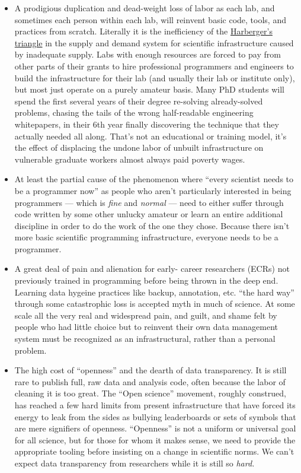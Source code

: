 \documentclass[10pt]{article}
\begin{document}
\begin{multicols}{2}
\begin{itemize}
\item
  A prodigious duplication and dead-weight loss of labor as each lab,
  and sometimes each person within each lab, will reinvent basic code,
  tools, and practices from scratch. Literally it is the inefficiency of
  the
  \href{https://en.wikipedia.org/wiki/Deadweight_loss\#Harberger's_triangle}{Harberger's
  triangle} in the supply and demand system for scientific
  infrastructure caused by inadequate supply. Labs with enough resources
  are forced to pay from other parts of their grants to hire
  professional programmers and engineers to build the infrastructure for
  their lab (and usually their lab or institute only), but most just
  operate on a purely amateur basis. Many PhD students will spend the
  first several years of their degree re-solving already-solved
  problems, chasing the tails of the wrong half-readable engineering
  whitepapers, in their 6th year finally discovering the technique that
  they actually needed all along. That's not an educational or training
  model, it's the effect of displacing the undone labor of unbuilt
  infrastructure on vulnerable graduate workers almost always paid
  poverty wages.
\item
  At least the partial cause of the phenomenon where ``every scientist
  needs to be a programmer now'' as people who aren't particularly
  interested in being programmers --- which is \emph{fine} and
  \emph{normal} --- need to either suffer through code written by some
  other unlucky amateur or learn an entire additional discipline in
  order to do the work of the one they chose. Because there isn't more
  basic scientific programming infrastructure, everyone needs to be a
  programmer.
\item
  A great deal of pain and alienation for early- career researchers
  (ECRs) not previously trained in programming before being thrown in
  the deep end. Learning data hygeine practices like backup, annotation,
  etc. ``the hard way'' through some catastrophic loss is accepted myth
  in much of science. At some scale all the very real and widespread
  pain, and guilt, and shame felt by people who had little choice but to
  reinvent their own data management system must be recognized as an
  infrastructural, rather than a personal problem.
\item
  The high cost of ``openness'' and the dearth of data transparency. It
  is still rare to publish full, raw data and analysis code, often
  because the labor of cleaning it is too great. The ``Open science''
  movement, roughly construed, has reached a few hard limits from
  present infrastructure that have forced its energy to leak from the
  sides as bullying leaderboards or sets of symbols that are mere
  signifiers of openness. ``Openness'' is not a uniform or universal
  goal for all science, but for those for whom it makes sense, we need
  to provide the appropriate tooling before insisting on a change in
  scientific norms. We can't expect data transparency from researchers
  while it is still so \emph{hard.}
\end{itemize}


\end{multicols}
\end{document}
